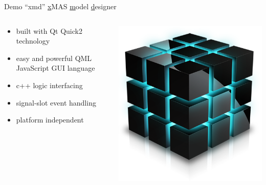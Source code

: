 \documentclass[11pt]{beamer}
\begin{document}
\begin{frame}{Demo ``xmd'' \underline{x}MAS \underline{m}odel \underline{d}esigner}

	\begin{columns}
		\begin{column}[b]{0.8\textwidth}
			\begin{itemize}
				\item built with Qt Quick2 technology
				\item easy and powerful QML JavaScript GUI language
				\item c++ logic interfacing
				\item signal-slot event handling
				\item platform independent
			\end{itemize}			
		\end{column}
		\begin{column}[c]{.5\textwidth}
			\includegraphics[width=0.75\linewidth]{pictures/2a-xmd}
		\end{column}
	\end{columns}
		
\end{frame}
\end{document}
